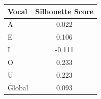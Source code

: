 \begin{tabular}{lc}
\toprule
\rowcolor{col01}
Vocal & Silhouette Score \\
\midrule
A & 0.022 \\
E & 0.106 \\
I & -0.111 \\
O & 0.233 \\
U & 0.223 \\
Global & 0.093 \\
\bottomrule
\end{tabular}
